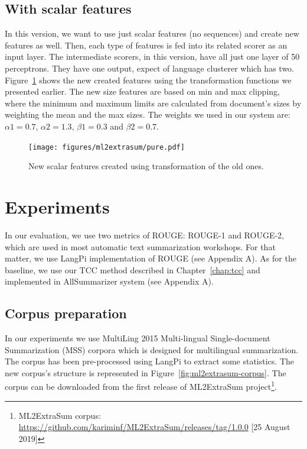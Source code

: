 \subsection{With scalar features}

In this version, we want to use just scalar features (no sequences) and create new features as well. 
Then, each type of features is fed into its related scorer as an input layer. 
The intermediate scorers, in this version, have all just one layer of 50 perceptrons. 
They have one output, expect of language clusterer which has two. 
Figure~\ref{fig:ml2extrasum-pure} shows the new created features using the transformation functions we presented earlier.
The new size features are based on min and max clipping, where the minimum and maximum limits are calculated from document's sizes by weighting the mean and the max sizes. 
The weights we used in our system are: $ \alpha 1 = 0.7 $, $ \alpha 2 = 1.3 $, $ \beta 1 = 0.3 $ and $ \beta 2 = 0.7 $.
%
\begin{figure}[!ht]
	\centering
	\texttt{[image: figures/ml2extrasum/pure.pdf]} %
	\caption{New scalar features created using transformation of the old ones.}
	\label{fig:ml2extrasum-pure}
\end{figure}


\section{Experiments}


In our evaluation, we use two metrics of ROUGE: ROUGE-1 and ROUGE-2, which are used in most automatic text summarization workshops.
For that matter, we use LangPi implementation of ROUGE (see Appendix A).
As for the baseline, we use our TCC method described in Chapter~\ref{chap:tcc} and implemented in AllSummarizer system (see Appendix A). 

\subsection{Corpus preparation}

In our experiments we use MultiLing 2015 Multi-lingual Single-document Summarization (MSS) corpora which is designed for multilingual summarization. 
The corpus has been pre-processed using LangPi to extract some statistics. 
The new corpus's structure is represented in Figure~\ref{fig:ml2extrasum-corpus}.
The corpus can be downloaded from the first release of ML2ExtraSum project\footnote{ML2ExtraSum corpus: \url{https://github.com/kariminf/ML2ExtraSum/releases/tag/1.0.0} [25 August 2019]}.

